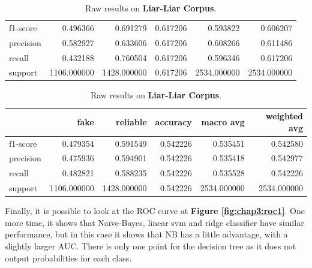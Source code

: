 \begin{table}
\begin{subtable}{\textwidth}
\begin{tabular}{lrrrrr}
\midrule
f1-score  &     0.496366 &     0.691279 &  0.617206 &     0.593822 &      0.606207 \\
precision &     0.582927 &     0.633606 &  0.617206 &     0.608266 &      0.611486 \\
recall    &     0.432188 &     0.760504 &  0.617206 &     0.596346 &      0.617206 \\
support   &  1106.000000 &  1428.000000 &  0.617206 &  2534.000000 &   2534.000000 \\
\bottomrule
\end{tabular}
\caption{Raw results for Ridge Classifer.}
\end{subtable}
\begin{subtable}{\textwidth}
\begin{tabular}{lrrrrr}
\toprule
{} &         fake &     reliable &  accuracy &    macro avg &  weighted avg \\
\midrule
f1-score  &     0.479354 &     0.591549 &  0.542226 &     0.535451 &      0.542580 \\
precision &     0.475936 &     0.594901 &  0.542226 &     0.535418 &      0.542977 \\
recall    &     0.482821 &     0.588235 &  0.542226 &     0.535528 &      0.542226 \\
support   &  1106.000000 &  1428.000000 &  0.542226 &  2534.000000 &   2534.000000 \\
\bottomrule
\end{tabular}
\caption{Raw results for Decision Tree}
\end{subtable}
\caption{Raw results on \textbf{Liar-Liar Corpus}.}
\end{table}
Finally, it is possible to look at the ROC curve at \textbf{Figure \ref{fig:chap3:roc1}}. One more time, it shows that Na\"{i}ve-Bayes, linear svm and ridge classifier have similar performance, but in this case it shows that NB has a little advantage, with a slightly larger AUC. There is only one point for the decision tree as it does not output probabilities for each class. \\

